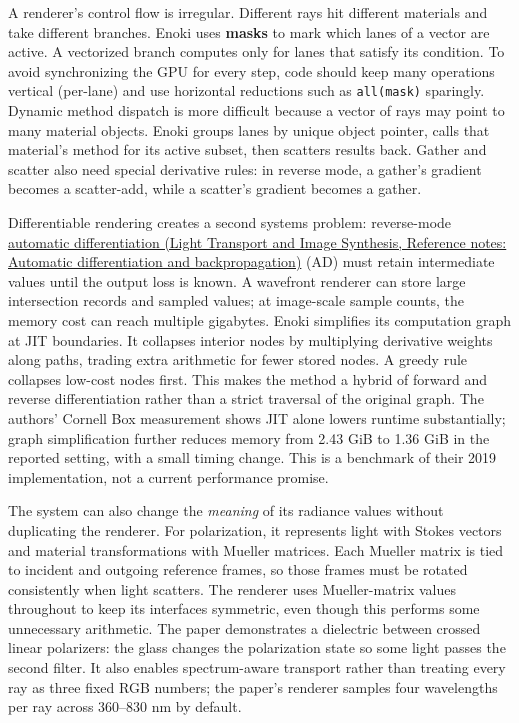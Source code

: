 A renderer's control flow is irregular. Different rays hit different materials and take different branches. Enoki uses \textbf{masks} to mark which lanes of a vector are active. A vectorized branch computes only for lanes that satisfy its condition. To avoid synchronizing the GPU for every step, code should keep many operations vertical (per-lane) and use horizontal reductions such as \texttt{all(mask)} sparingly. Dynamic method dispatch is more difficult because a vector of rays may point to many material objects. Enoki groups lanes by unique object pointer, calls that material's method for its active subset, then scatters results back. Gather and scatter also need special derivative rules: in reverse mode, a gather's gradient becomes a scatter-add, while a scatter's gradient becomes a gather.

Differentiable rendering creates a second systems problem: reverse-mode \href{../04-Light-Transport-and-Image-Synthesis/main.pdf\#nameddest=appendix-40df0855b4a7}{automatic differentiation (Light Transport and Image Synthesis, Reference notes: Automatic differentiation and backpropagation)} (AD) must retain intermediate values until the output loss is known. A wavefront renderer can store large intersection records and sampled values; at image-scale sample counts, the memory cost can reach multiple gigabytes. Enoki simplifies its computation graph at JIT boundaries. It collapses interior nodes by multiplying derivative weights along paths, trading extra arithmetic for fewer stored nodes. A greedy rule collapses low-cost nodes first. This makes the method a hybrid of forward and reverse differentiation rather than a strict traversal of the original graph. The authors' Cornell Box measurement shows JIT alone lowers runtime substantially; graph simplification further reduces memory from 2.43 GiB to 1.36 GiB in the reported setting, with a small timing change. This is a benchmark of their 2019 implementation, not a current performance promise.

The system can also change the \emph{meaning} of its radiance values without duplicating the renderer. For polarization, it represents light with Stokes vectors and material transformations with Mueller matrices. Each Mueller matrix is tied to incident and outgoing reference frames, so those frames must be rotated consistently when light scatters. The renderer uses Mueller-matrix values throughout to keep its interfaces symmetric, even though this performs some unnecessary arithmetic. The paper demonstrates a dielectric between crossed linear polarizers: the glass changes the polarization state so some light passes the second filter. It also enables spectrum-aware transport rather than treating every ray as three fixed RGB numbers; the paper's renderer samples four wavelengths per ray across 360--830 nm by default.

